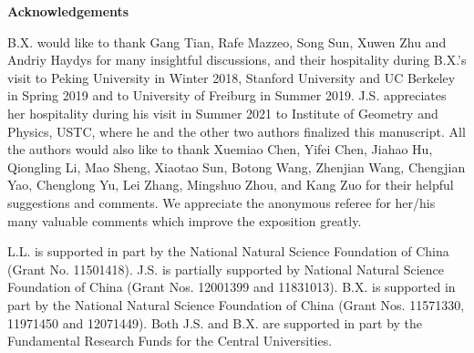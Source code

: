 \documentclass[12pt]{article}
\begin{document}
\begin{center}
 {\bf Acknowledgements}
\end{center}

\noindent B.X. would like to thank Gang Tian, Rafe Mazzeo, Song Sun, Xuwen Zhu and Andriy Haydys for many insightful discussions, and their hospitality during B.X.'s visit to Peking University in Winter 2018, Stanford University and UC Berkeley in Spring 2019 and to University of Freiburg in Summer 2019.
J.S. appreciates her hospitality during his visit in Summer 2021 to Institute of Geometry and Physics, USTC, where he and the other two authors finalized this manuscript.
All the authors would also like to thank Xuemiao Chen, Yifei Chen, Jiahao Hu, Qiongling Li,
Mao Sheng, Xiaotao Sun, Botong Wang, Zhenjian Wang, Chengjian Yao, Chenglong Yu, Lei Zhang, Mingshuo Zhou, and Kang Zuo for their helpful suggestions and comments. We appreciate  the anonymous referee
for her/his many valuable comments which improve the exposition greatly.

L.L. is supported in part by the National Natural Science Foundation of China (Grant No. 11501418).
J.S. is partially supported by National Natural Science Foundation of China (Grant Nos. 12001399 and 11831013).
B.X. is supported in part by the National Natural Science Foundation of China (Grant Nos. 11571330, 11971450 and 12071449).
Both J.S. and B.X. are supported in part by the Fundamental Research Funds for the Central Universities.
\end{document}
